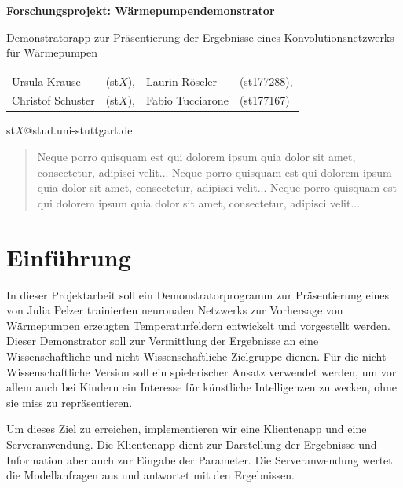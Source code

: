 \documentclass[a4paper]{extarticle}
\begin{document}
    \begin{center}
        \huge
        \textbf{Forschungsprojekt: Wärmepumpendemonstrator}
            
        \vspace{0.4cm}
        \large
        Demonstratorapp zur Präsentierung der Ergebnisse eines Konvolutionsnetzwerks für Wärmepumpen
            
        \vspace{0.6cm}
        \normalsize
        \begin{tabular}{llll}
            Ursula Krause & (st$X$), & Laurin Röseler & (st177288),\\
            Christof Schuster & (st$X$), & Fabio Tucciarone & (st177167)
        \end{tabular}

        \vspace{0.3cm}
        st$X$@stud.uni-stuttgart.de
        
        \vspace{0.8cm}
    \end{center}

    \begin{abstract}
        Neque porro quisquam est qui dolorem ipsum quia dolor sit amet, consectetur, adipisci velit...
        Neque porro quisquam est qui dolorem ipsum quia dolor sit amet, consectetur, adipisci velit...
        Neque porro quisquam est qui dolorem ipsum quia dolor sit amet, consectetur, adipisci velit...
    \end{abstract}

    \section{Einführung}

    In dieser Projektarbeit soll ein Demonstratorprogramm zur Präsentierung eines von Julia Pelzer trainierten neuronalen Netzwerks
    zur Vorhersage von Wärmepumpen erzeugten Temperaturfeldern entwickelt und vorgestellt werden.
    Dieser Demonstrator soll zur Vermittlung der Ergebnisse an eine Wissenschaftliche und nicht-Wissenschaftliche Zielgruppe dienen.
    Für die nicht-Wissenschaftliche Version soll ein spielerischer Ansatz verwendet werden, 
    um vor allem auch bei Kindern ein Interesse für künstliche Intelligenzen zu wecken, ohne sie miss zu repräsentieren.

    Um dieses Ziel zu erreichen, implementieren wir eine Klientenapp und eine Serveranwendung.
    Die Klientenapp dient zur Darstellung der Ergebnisse und Information aber auch zur Eingabe der Parameter.
    Die Serveranwendung wertet die Modellanfragen aus und antwortet mit den Ergebnissen.
\end{document}
